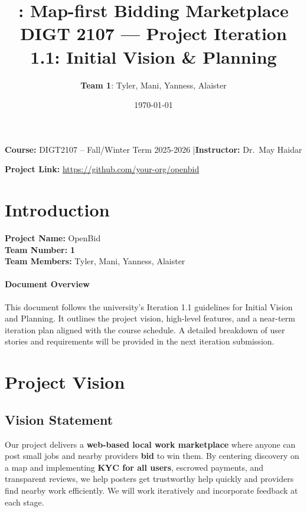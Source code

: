 \documentclass[11pt]{article}
\title{\product: Map-first Bidding Marketplace\\\Large DIGT 2107 --- Project Iteration 1.1: Initial Vision \& Planning}
\author{\textbf{Team 1}: Tyler, Mani, Yanness, Alaister}
\date{\today}
\newcommand{\product}{OpenBid}
\newcommand{\repoURL}{https://github.com/your-org/openbid}
\begin{document}
\maketitle

\begin{center}
\textbf{Course:} DIGT2107 -- Fall/Winter Term 2025-2026 \quad|\quad \textbf{Instructor:} Dr.\ May Haidar
\end{center}

\begin{center}
\textbf{Project Link:} \href{\repoURL}{\repoURL}
\end{center}

\newpage

\section{Introduction}
\textbf{Project Name:} \product \\
\textbf{Team Number:} \textbf{1} \\
\textbf{Team Members:} Tyler, Mani, Yanness, Alaister

\paragraph{Document Overview}
This document follows the university's Iteration 1.1 guidelines for Initial Vision and Planning. It outlines the project vision, high-level features, and a near-term iteration plan aligned with the course schedule. A detailed breakdown of user stories and requirements will be provided in the next iteration submission.

\section{Project Vision}
\subsection*{Vision Statement}
Our project delivers a \textbf{web-based local work marketplace} where anyone can post small jobs and nearby providers \textbf{bid} to win them. By centering discovery on a map and implementing \textbf{KYC for all users}, escrowed payments, and transparent reviews, we help posters get trustworthy help quickly and providers find nearby work efficiently. We will work iteratively and incorporate feedback at each stage.
\end{document}

